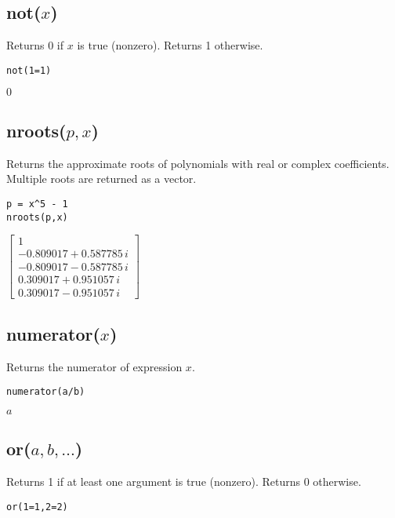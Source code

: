 \subsection*{not($x$)}

Returns 0 if $x$ is true (nonzero).
Returns 1 otherwise.

{\color{blue}
\begin{verbatim}
not(1=1)
\end{verbatim}
}

\noindent
$0$

\subsection*{nroots($p,x$)}

Returns the approximate roots of polynomials with real or complex coefficients.
Multiple roots are returned as a vector.

{\color{blue}
\begin{verbatim}
p = x^5 - 1
nroots(p,x)
\end{verbatim}
}

\noindent
$\displaystyle
\begin{bmatrix}
1
\\[1ex]
-0.809017 + 0.587785\,i
\\[1ex]
-0.809017 - 0.587785\,i
\\[1ex]
0.309017 + 0.951057\,i
\\[1ex]
0.309017 - 0.951057\,i
\end{bmatrix}
$

\subsection*{numerator($x$)}

Returns the numerator of expression $x$.

{\color{blue}
\begin{verbatim}
numerator(a/b)
\end{verbatim}
}

\noindent
$a$

\subsection*{or($a,b,\ldots$)}

Returns 1 if at least one argument is true (nonzero).
Returns 0 otherwise.

{\color{blue}
\begin{verbatim}
or(1=1,2=2)
\end{verbatim}
}

